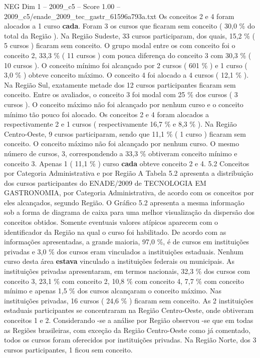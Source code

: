 \begin{textsample}{NEG Dim 1 – 2009\_c5 – Score 1.00 – 2009\_c5/enade\_2009\_tec\_gastr\_61596a793a.txt}
Os conceitos 2 e 4 foram alocados a 1 curso \textbf{cada}.
Foram 3 os cursos que ficaram sem conceito ( 30,0 \% do total da Região ).
Na Região Sudeste, 33 cursos participaram, dos quais, 15,2 \% ( 5 cursos ) ficaram sem conceito.
O grupo modal entre os com conceito foi o conceito 2, 33,3 \% ( 11 cursos ) com pouca diferença do conceito 3 com 30,3 \% ( 10 cursos ).
O conceito mínimo foi alcançado por 2 cursos ( 601 \% ) e 1 curso ( 3,0 \% ) obteve conceito máximo.
O conceito 4 foi alocado a 4 cursos ( 12,1 \% ).
Na Região Sul, exatamente metade dos 12 cursos participantes ficaram sem conceito.
Entre os avaliados, o conceito 3 foi modal com 25 \% dos cursos ( 3 cursos ).
O conceito máximo não foi alcançado por nenhum curso e o conceito mínimo tão pouco foi alocado.
Os conceitos 2 e 4 foram alocados a respectivamente 2 e 1 cursos ( respectivamente 16,7 \% e 8,3 \% ).
Na Região Centro-Oeste, 9 cursos participaram, sendo que 11,1 \% ( 1 curso ) ficaram sem conceito.
O conceito máximo não foi alcançado por nenhum curso.
O mesmo número de cursos, 3, correspondendo a 33,3 \% obtiveram conceito mínimo e conceito 3.
Apenas 1 ( 11,1 \% ) curso \textbf{cada} obteve conceito 2 e 4. 5.2 Conceitos por Categoria Administrativa e por Região A Tabela 5.2 apresenta a distribuição dos cursos participantes do ENADE/2009 de TECNOLOGIA EM GASTRONOMIA, por Categoria Administrativa, de acordo com os conceitos por eles alcançados, segundo Região.
O Gráfico 5.2 apresenta a mesma informação sob a forma de diagrama de caixa para uma melhor visualização da dispersão dos conceitos obtidos.
Somente eventuais valores atípicos aparecem com o identificador da Região na qual o curso foi habilitado.
De acordo com as informações apresentadas, a grande maioria, 97,0 \%, é de cursos em instituições privadas e 3,0 \% dos cursos eram vinculados a instituições estaduais.
Nenhum curso desta área \textbf{estava} vinculado a instituições federais ou municipais.
As instituições privadas apresentaram, em termos nacionais, 32,3 \% dos cursos com conceito 3, 23,1 \% com conceito 2, 10,8 \% com conceito 4, 7,7 \% com conceito mínimo e apenas 1,5 \% dos cursos alcançaram o conceito máximo.
Nas instituições privadas, 16 cursos ( 24,6 \% ) ficaram sem conceito.
As 2 instituições estaduais participantes se concentraram na Região Centro-Oeste, onde obtiveram conceitos 1 e 2.
Considerando -se a análise por Região observou -se que em todas as Regiões brasileiras, com exceção da Região Centro-Oeste como já comentado, todos os cursos foram oferecidos por instituições privadas.
Na Região Norte, dos 3 cursos participantes, 1 ficou sem conceito.

\end{textsample}
